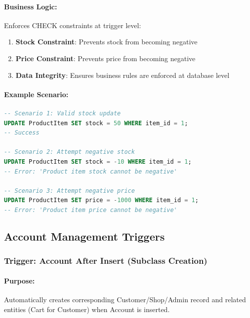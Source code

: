 \paragraph{Business Logic:}
Enforces CHECK constraints at trigger level:
\begin{enumerate}
    \item \textbf{Stock Constraint}: Prevents stock from becoming negative
    \item \textbf{Price Constraint}: Prevents price from becoming negative
    \item \textbf{Data Integrity}: Ensures business rules are enforced at database level
\end{enumerate}

\paragraph{Example Scenario:}

\begin{lstlisting}[language=SQL]
-- Scenario 1: Valid stock update
UPDATE ProductItem SET stock = 50 WHERE item_id = 1;
-- Success

-- Scenario 2: Attempt negative stock
UPDATE ProductItem SET stock = -10 WHERE item_id = 1;
-- Error: 'Product item stock cannot be negative'

-- Scenario 3: Attempt negative price
UPDATE ProductItem SET price = -1000 WHERE item_id = 1;
-- Error: 'Product item price cannot be negative'
\end{lstlisting}

\subsection{Account Management Triggers}

\subsubsection{Trigger: Account After Insert (Subclass Creation)}

\paragraph{Purpose:} Automatically creates corresponding Customer/Shop/Admin record and related entities (Cart for Customer) when Account is inserted.

